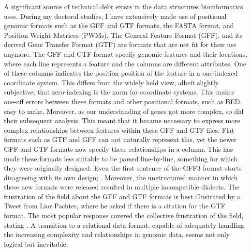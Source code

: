 A significant source of technical debt exists in the data structures bioinformatics uses. During my doctoral studies, I have extensively made use of positional genomic formats such as the GFF and GTF formats, the FASTA format, and Position Weight Matrices (PWMs). The General Feature Format (GFF), and its derived Gene Transfer Format (GTF) are formats that are not fit for their use anymore. The GFF and GTF format specify genomic features and their locations, where each line represents a feature and the columns are different attributes. One of these columns indicates the position position of the feature in a one-indexed coordinate system. This differs from the widely held view, albeit slightly subjective, that zero-indexing is the norm for coordinate systems\cite{utexasEWDijkstra}. This makes one-off errors between these formats and other positional formats, such as BED, easy to make. Moreover, as our understanding of genes got more complex, so did their subsequent analysis. This meant that it became necessary to express more complex relationships between features within these GFF and GTF files. Flat formats such as GTF and GFF can not naturally represent this, yet the newer GFF and GTF formats now specify these relationships in a  column. This has made these formats less suitable to be parsed line-by-line, something for which they were originally designed. Even the first sentence of the GFF3 format starts disagreeing with its own design; \cite{GFFformat}. Moreover, the unstructured manner in which these new formats were released resulted in multiple incompatible dialects. The frustration of the field about the GFF and GTF formats is best illustrated by a Tweet from Lior Pachter, where he asked if there is a citation for the GTF format. The most popular response covered the collective frustration of the field, stating \cite{Pachter_2023}. A transition to a relational data format, capable of adequately handling the increasing complexity and relationships in genomic data, seems not only logical but inevitable.

